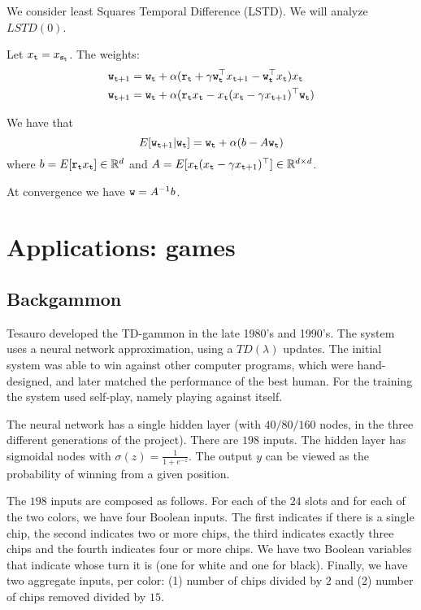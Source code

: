 \begin{leftbar}
We consider least Squares Temporal Difference (LSTD). We will
analyze $LSTD(0)$.

Let $x_{\tt t}=x_{{\tt s}_{\tt t}}$. The weights:
\begin{align*}
{\tt w}_{{\tt t}+1} &= {\tt w}_{\tt t} +\alpha ({\tt r}_{\tt t}+\gamma
{\tt w}_{\tt t}^\top x_{{\tt t}+1}-{\tt w}_{\tt t}^\top
x_{\tt t})x_{\tt t}\\
{\tt w}_{{\tt t}+1} &= {\tt w}_{\tt t} +\alpha ({\tt r}_{\tt t}
x_{\tt t}-x_{\tt t}(x_{\tt t}-\gamma x_{{\tt t}+1})^\top {\tt w}_{\tt t})
\end{align*}

We have that
\[
E[{\tt w}_{{\tt t}+1}|{\tt w}_{\tt t}]={\tt w}_{\tt t} +\alpha
(b-A{\tt w}_{\tt t})
\]
where $b=E[{\tt r}_{\tt t} x_{\tt t}]\in \mathbb{R}^d$ and
$A=E[x_{\tt t}(x_{\tt t}-\gamma x_{{\tt t}+1})^\top]\in\mathbb{R}^{d\times
d}$.

At convergence we have ${\tt w}=A^{-1}b$.

\end{leftbar}


\section{Applications: games}

\subsection{Backgammon}

Tesauro developed the TD-gammon in the late 1980's and 1990's. The
system uses a neural network approximation, using a $TD(\lambda)$
updates. The initial system was able to win against other computer
programs, which were hand-designed, and later matched the
performance of the best human. For the training the system used
self-play, namely playing against itself.

The neural network has a single hidden layer (with $40/80/160$
nodes, in the three different generations of the project). There are
$198$ inputs. The hidden layer has sigmoidal nodes with
$\sigma(z)=\frac{1}{1+e^{-z}}$. The output $y$ can be viewed as the
probability of winning from a given position.

The $198$ inputs are composed as follows. For each of the $24$ slots
and for each of the two colors, we have four Boolean inputs. The
first indicates if there is a single chip, the second indicates two
or more chips, the third indicates exactly three chips and the
fourth indicates four or more chips. We have two Boolean variables
that indicate whose turn it is (one for white and one for black).
Finally, we have two aggregate inputs, per color: (1) number of
chips divided by $2$ and (2) number of chips removed divided by
$15$.

